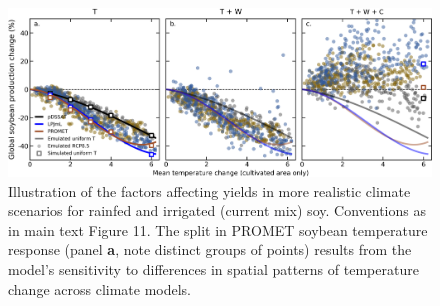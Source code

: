 \documentclass[12pt]{article}
\begin{document}
{{\begin{figure}[h!]
  \centering
  \includegraphics[width = 16.3cm]{LPJmL_pDSSAT_PROMET_RCP85_all_cases_soy.png}
  \caption{
	  Illustration of the factors affecting yields in more realistic climate scenarios for rainfed and irrigated (current mix) soy. Conventions as in main text Figure 11. The split in PROMET soybean temperature response (panel \textbf{a}, note distinct groups of points) results from the model's sensitivity to differences in spatial patterns of temperature change across climate models. 
  }
\end{figure}

\clearpage
}}
\end{document}
